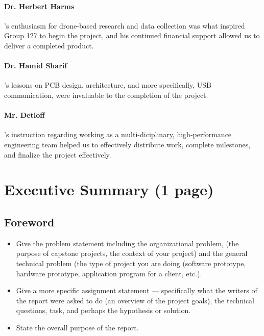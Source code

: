 \documentclass[12pt]{article}
\begin{document}
\paragraph{Dr. Herbert Harms}'s enthusiasm for drone-based research and data collection was what inspired Group 127 to begin the project, and his continued financial support allowed us to deliver a completed product.
\paragraph{Dr. Hamid Sharif}'s lessons on PCB design, architecture, and more specifically, USB communication, were invaluable to the completion of the project.
\paragraph{Mr. Detloff}'s instruction regarding working as a multi-diciplinary, high-performance engineering team helped us to effectively distribute work, complete milestones, and finalize the project effectively.

\section*{Executive Summary (1 page)}

\subsection*{Foreword}
\begin{itemize}[noitemsep]
    \item Give the problem statement including the organizational problem, (the purpose of capstone projects, the context of your project) and the general technical problem (the type of project you are doing (software prototype, hardware prototype, application program for a client, etc.).
    \item Give a more specific assignment statement --- specifically what the writers of the report were asked to do (an overview of the project goals), the technical questions, task, and perhaps the hypothesis or solution.
    \item State the overall purpose of the report.
\end{itemize}
\end{document}
